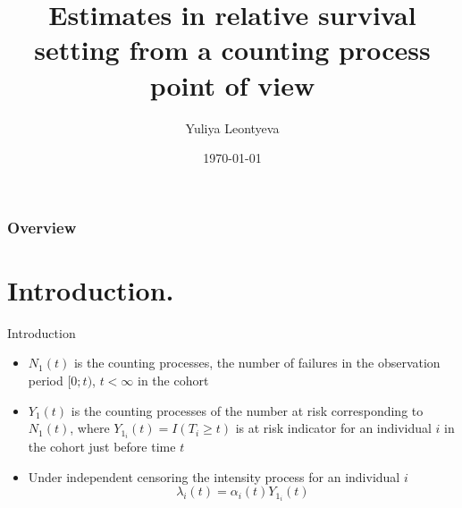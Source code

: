\documentclass{beamer}
\title{Estimates in relative survival setting from a counting process point of view}
\author{Yuliya Leontyeva}
\institute{Karolinska Institute, MEB}
\date{{\today}}
\begin{document}
\maketitle

\begin{frame}
\frametitle{Overview} %
\tableofcontents %
\end{frame}


\section{Introduction.}

\begin{frame}{Introduction}
\small
\begin{itemize}
    \item $N_1(t)$ is the counting processes, the number of failures in the observation period $[0; t)$, $t < \infty$ in the cohort 
    \item $Y_1(t)$ is the counting processes of the number at risk corresponding to $N_1(t)$, where $Y_1_{i}(t) = I(T_i \geq t)$ is at risk indicator for an individual $i$ in the cohort just before time $t$ 
    \item Under independent censoring the intensity process for an individual $i$  $$\lambda_i(t) = \alpha_i(t) Y_1_{i}(t)$$
 \end{itemize}
\end{frame}
 
\end{document}
